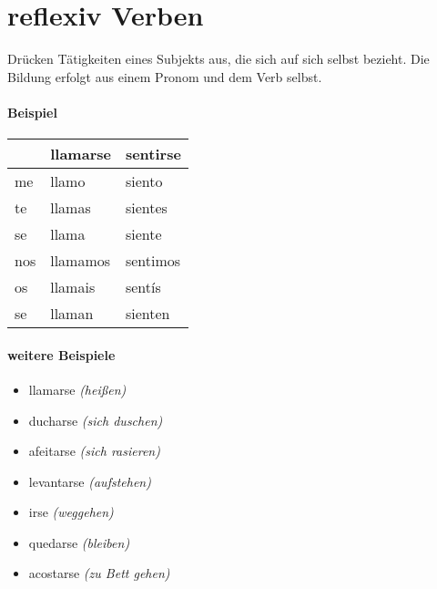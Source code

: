 \documentclass[10pt,spanish]{report}
\begin{document}
\chapter*{reflexiv Verben}
Drücken Tätigkeiten eines Subjekts aus, die sich auf sich selbst bezieht. Die Bildung erfolgt aus einem Pronom und dem Verb selbst.

\subsubsection*{Beispiel}
\begin{longtable}{p{} | p{} | p{} } 
\textbf{~}     & \textbf{llamarse} & \textbf{sentirse} \\ \hline
\hline
\endhead %
me & llamo & siento \\
te & llamas & sientes \\
se & llama & siente\\
nos & llamamos & sentimos\\
os & llamais & sentís\\
se & llaman & sienten\\
\end{longtable}

\subsubsection*{weitere Beispiele}
\begin{itemize}
  \item llamarse \textit{(heißen)}
  \item ducharse \textit{(sich duschen)}
  \item afeitarse \textit{(sich rasieren)}
  \item levantarse \textit{(aufstehen)}
  \item irse \textit{(weggehen)}
  \item quedarse \textit{(bleiben)}
  \item acostarse \textit{(zu Bett gehen)}
\end{itemize}
\end{document}
